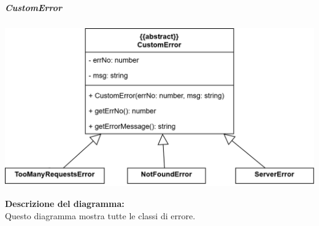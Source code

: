 \subparagraph{CustomError}
\begin{center}
      \includegraphics[scale=0.25]{template/images/uml_front/logic/CustomError.png}
\end{center}
\textbf{Descrizione del diagramma:}\\
Questo diagramma mostra tutte le classi di errore.
